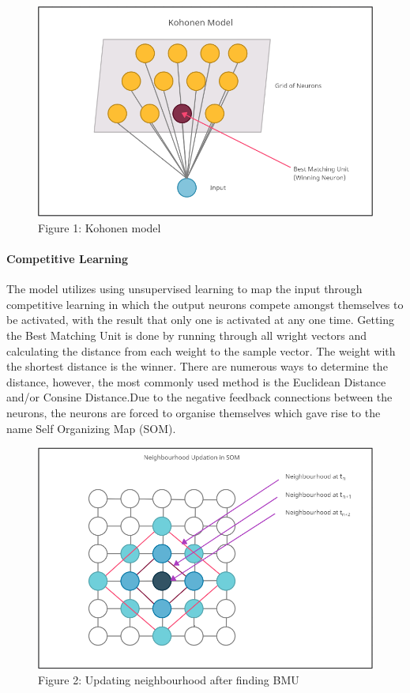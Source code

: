 \documentclass[
]{article}
\begin{document}
\begin{figure}
\centering
\includegraphics{model.png}
\caption{Figure 1: Kohonen model}
\end{figure}

\hypertarget{competitive-learning}{%
\paragraph{Competitive Learning}\label{competitive-learning}}

The model utilizes using unsupervised learning to map the input through
competitive learning in which the output neurons compete amongst
themselves to be activated, with the result that only one is activated
at any one time. Getting the Best Matching Unit is done by running
through all wright vectors and calculating the distance from each weight
to the sample vector. The weight with the shortest distance is the
winner. There are numerous ways to determine the distance, however, the
most commonly used method is the Euclidean Distance and/or Consine
Distance.Due to the negative feedback connections between the neurons,
the neurons are forced to organise themselves which gave rise to the
name Self Organizing Map (SOM).

\begin{figure}
\centering
\includegraphics{neigh.png}
\caption{Figure 2: Updating neighbourhood after finding BMU}
\end{figure}
\end{document}
